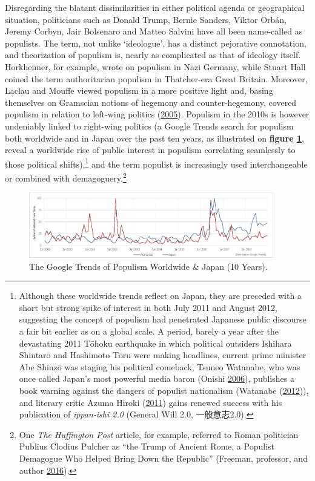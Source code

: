 \documentclass[10pt,british,A4paper,twoside]{memoir}
\begin{document}
Disregarding the blatant dissimilarities in either political agenda or
geographical situation, politicians such as Donald Trump, Bernie
Sanders, Viktor Orbán, Jeremy Corbyn, Jair Bolsenaro and Matteo Salvini
have all been name-called as populists. The term, not unlike
`ideologue', has a distinct pejorative connotation, and theorization of
populism is, nearly as complicated as that of ideology itself.
Horkheimer, for example, wrote on populism in Nazi Germany, while Stuart
Hall coined the term authoritarian populism in Thatcher-era Great
Britain. Moreover, Laclau and Mouffe viewed populism in a more positive
light and, basing themselves on Gramscian notions of hegemony and
counter-hegemony, covered populism in relation to left-wing politics
(\protect\hyperlink{ref-laclau_populist_2005}{2005}). Populism in the
2010s is however undeniably linked to right-wing politics (a Google
Trends search for populism both worldwide and in Japan over the past ten
years, as illustrated on \textbf{figure \ref{fig:populismtrends}},
reveal a worldwide rise of public interest in populism correlating
seamlessly to those political shifts),\footnote{Although these worldwide
  trends reflect on Japan, they are preceded with a short but strong
  spike of interest in both July 2011 and August 2012, suggesting the
  concept of populism had penetrated Japanese public discourse a fair
  bit earlier as on a global scale. A period, barely a year after the
  devastating 2011 Tōhoku earthquake in which political outsiders
  Ishihara Shintarō and Hashimoto Tōru were making headlines, current
  prime minister Abe Shinzō was staging his political comeback, Tsuneo
  Watanabe, who was once called Japan's most powerful media baron
  (Onishi \protect\hyperlink{ref-onishi_shadow_2006}{2006}), publishes a
  book warning against the dangers of populist nationalism (Watanabe
  (\protect\hyperlink{ref-watanabe_anti-populism_2012}{2012})), and
  literary critic Azuma Hiroki
  (\protect\hyperlink{ref-azuma_ippan_2011}{2011}) gains renewed success
  with his publication of \emph{ippan-ishi 2.0} (General Will 2.0,
  一般意志2.0).} and the term populist is increasingly used
interchangeable or combined with demagoguery.\footnote{One \emph{The
  Huffington Post} article, for example, referred to Roman politician
  Publius Clodius Pulcher as ``the Trump of Ancient Rome, a Populist
  Demagogue Who Helped Bring Down the Republic'' (Freeman, professor,
  and author \protect\hyperlink{ref-freeman_meet_2016}{2016}).}

\begin{figure}[!htb]
 \centering
 \caption{\label{fig:populismtrends} The Google Trends of Populism Worldwide \& Japan (10 Years).}
 \includegraphics[width=0.95\textwidth,trim=4 4 4 4,clip]{images/populismtrends.eps}\end{figure}
\end{document}
